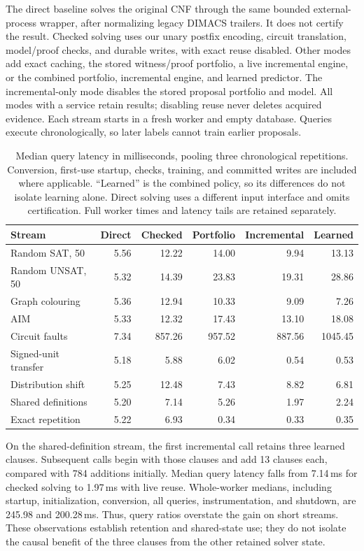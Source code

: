 \documentclass[11pt,a4paper]{article}
\numberwithin{equation}{section}
\theoremstyle{plain}
\theoremstyle{definition}
\theoremstyle{remark}
\begin{document}
The direct baseline solves the original CNF through the same bounded external-process wrapper, after normalizing legacy DIMACS trailers. It does not certify the result. Checked solving uses our unary postfix encoding, circuit translation, model/proof checks, and durable writes, with exact reuse disabled. Other modes add exact caching, the stored witness/proof portfolio, a live incremental engine, or the combined portfolio, incremental engine, and learned predictor. The incremental-only mode disables the stored proposal portfolio and model. All modes with a service retain results; disabling reuse never deletes acquired evidence. Each stream starts in a fresh worker and empty database. Queries execute chronologically, so later labels cannot train earlier proposals.

\begin{table}[htbp]
\centering
\small
\setlength{\tabcolsep}{5pt}
\begin{tabular}{lrrrrr}
\toprule
Stream & Direct & Checked & Portfolio & Incremental & Learned \\
\midrule
Random SAT, 50 & 5.56 & 12.22 & 14.00 & 9.94 & 13.13 \\
Random UNSAT, 50 & 5.32 & 14.39 & 23.83 & 19.31 & 28.86 \\
Graph colouring & 5.36 & 12.94 & 10.33 & 9.09 & 7.26 \\
AIM & 5.33 & 12.32 & 17.43 & 13.10 & 18.08 \\
Circuit faults & 7.34 & 857.26 & 957.52 & 887.56 & 1045.45 \\
Signed-unit transfer & 5.18 & 5.88 & 6.02 & 0.54 & 0.53 \\
Distribution shift & 5.25 & 12.48 & 7.43 & 8.82 & 6.81 \\
Shared definitions & 5.20 & 7.14 & 5.26 & 1.97 & 2.24 \\
Exact repetition & 5.22 & 6.93 & 0.34 & 0.33 & 0.35 \\
\bottomrule
\end{tabular}
\caption{Median query latency in milliseconds, pooling three chronological repetitions. Conversion, first-use startup, checks, training, and committed writes are included where applicable. ``Learned'' is the combined policy, so its differences do not isolate learning alone. Direct solving uses a different input interface and omits certification. Full worker times and latency tails are retained separately.}
\label{tab:expanded-results}
\end{table}

On the shared-definition stream, the first incremental call retains three learned clauses. Subsequent calls begin with those clauses and add 13 clauses each, compared with 784 additions initially. Median query latency falls from 7.14\,ms for checked solving to 1.97\,ms with live reuse. Whole-worker medians, including startup, initialization, conversion, all queries, instrumentation, and shutdown, are 245.98 and 200.28\,ms. Thus, query ratios overstate the gain on short streams. These observations establish retention and shared-state use; they do not isolate the causal benefit of the three clauses from the other retained solver state.
\end{document}
